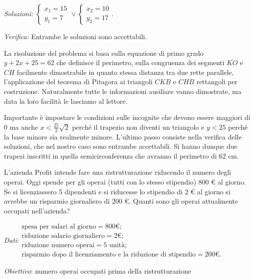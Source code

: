 \emph{Soluzioni: } \(\left\{\begin{array}{l}{x_1=15}\\{y_1=7}\end{array}\right.\vee \left\{\begin{array}{l}{x_2=10}\\{y_2=17}\end{array}\right.\).

\emph{Verifica: }Entrambe le soluzioni sono accettabili.

La risoluzione del problema si basa sulla equazione di primo grado \(y+2x+25=62\) che definisce il perimetro, sulla congruenza dei segmenti \(\overline{{KO}}\) e \(\overline{{CH}}\) facilmente dimostrabile in quanto stessa distanza tra due rette parallele, l'applicazione del teorema di Pitagora ai triangoli \({CKB}\) e \({CHB}\) rettangoli per costruzione. Naturalmente tutte le informazioni ausiliare vanno dimostrate, ma data la loro facilità le lasciamo al lettore.

Importante è impostare le condizioni sulle incognite che devono essere maggiori di \(0\) ma anche \(x<\frac{25} 2\sqrt 2\) perché il trapezio non diventi un triangolo e \(y<25\) perché la base minore sia realmente minore. L'ultimo passo consiste nella verifica delle soluzioni, che nel nostro caso sono entrambe accettabili. Si hanno dunque due trapezi inscritti in quella semicirconferenza che avranno il perimetro di 62 cm.

\begin{problema}
L'azienda Profit intende fare una ristrutturazione riducendo il numero degli operai. Oggi spende per gli operai (tutti con lo stesso stipendio) 800 € al giorno. Se si licenziassero 5 dipendenti e si riducesse lo stipendio di 2 € al giorno si avrebbe un risparmio giornaliero di 200 €. Quanti sono gli operai attualmente occupati nell'azienda?
\end{problema}

\emph{Dati}:\( \begin{array}{l}
\text{spesa per salari al giorno}= 800\unit{\text{€}};\\
\text{riduzione salario giornaliero}= 2\unit{\text{€}};\\
\text{riduzione numero operai}= 5\text{ unità};\\
\text{risparmio dopo il licenziamento e la riduzione di stipendio}= 200\unit{\text{€}}.
\end{array}\)

\emph{Obiettivo}: numero operai occupati prima della ristrutturazione

